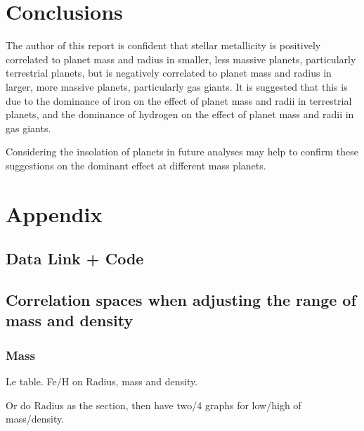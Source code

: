 \documentclass[a4paper,twocolumn,12pt]{article}
\begin{document}
\section{Conclusions}
The author of this report is confident that stellar metallicity is positively correlated to planet mass and radius in smaller, less massive planets, particularly terrestrial planets, but is negatively correlated to planet mass and radius in larger, more massive planets, particularly gas giants. It is suggested that this is due to the dominance of iron on the effect of planet mass and radii in terrestrial planets, and the dominance of hydrogen on the effect of planet mass and radii in gas giants.

Considering the insolation of planets in future analyses may help to confirm these suggestions on the dominant effect at different mass planets.


\section{Appendix}
\subsection{Data Link + Code}

\subsection{Correlation spaces when adjusting the range of mass and density}
\subsubsection{Mass}

Le table. Fe/H on Radius, mass and density.

Or do Radius as the section, then have two/4 graphs for low/high of mass/density.



\vspace{-1em}
\footnotesize

\end{document}
